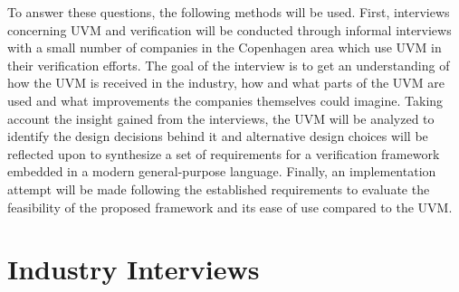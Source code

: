 To answer these questions, the following methods will be used. First, interviews concerning UVM and verification
will be conducted through informal interviews with a small number of companies in the Copenhagen area which use UVM
in their verification efforts. The goal of the interview is to get an understanding of how the UVM is received in the
industry, how and what parts of the UVM are used and what improvements the companies themselves could imagine. Taking
account the insight gained from the interviews, the UVM will be analyzed to identify the design decisions behind it
and alternative design choices will be reflected upon to synthesize a set of requirements for a verification
framework embedded in a modern general-purpose language. Finally, an implementation attempt will be made following
the established requirements to evaluate the feasibility of the proposed framework and its ease of use compared to the UVM.

\chapter{Industry Interviews}

